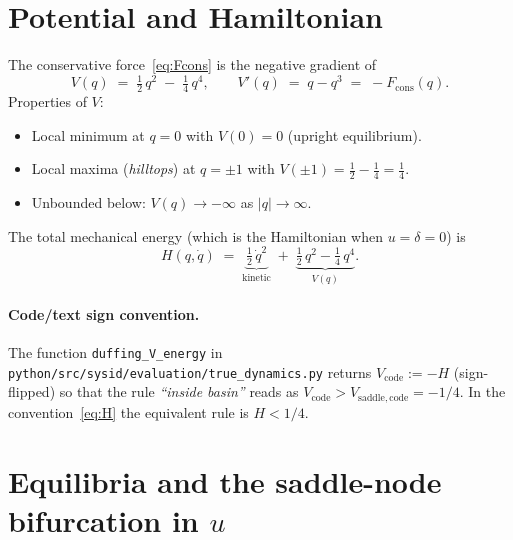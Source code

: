 \documentclass[11pt]{article}
\begin{document}
\section{Potential and Hamiltonian}

The conservative force~\eqref{eq:Fcons} is the negative gradient of
\begin{equation}
V(q) \;=\; \tfrac{1}{2}\,q^2 \;-\; \tfrac{1}{4}\,q^4,
\qquad
V'(q) \;=\; q - q^3 \;=\; -F_{\mathrm{cons}}(q).
\label{eq:V}
\end{equation}
Properties of $V$:
\begin{itemize}
\item Local minimum at $q=0$ with $V(0) = 0$ (upright equilibrium).
\item Local maxima (\emph{hilltops}) at $q=\pm 1$ with
      \(V(\pm 1) = \tfrac{1}{2} - \tfrac{1}{4} = \tfrac{1}{4}\).
\item Unbounded below: $V(q) \to -\infty$ as $|q|\to\infty$.
\end{itemize}
The total mechanical energy (which is the Hamiltonian when
$u = \delta = 0$) is
\begin{equation}
H(q,\dot q)
  \;=\; \underbrace{\tfrac{1}{2}\,\dot q^2}_{\text{kinetic}}
        \;+\; \underbrace{\tfrac{1}{2}\,q^2 - \tfrac{1}{4}\,q^4}_{V(q)}.
\label{eq:H}
\end{equation}

\paragraph{Code/text sign convention.} The function
\texttt{duffing\_V\_energy} in
\texttt{python/src/sysid/evaluation/true\_dynamics.py} returns
$V_{\mathrm{code}} := -H$ (sign-flipped) so that the rule
{\it``inside basin''} reads as \(V_{\mathrm{code}} > V_{\mathrm{saddle,code}} = -1/4\).
In the convention~\eqref{eq:H} the equivalent rule is $H < 1/4$.

\section{Equilibria and the saddle-node bifurcation in $u$}
\end{document}
